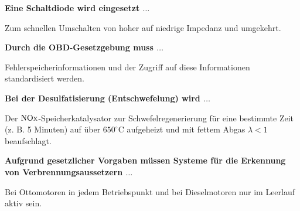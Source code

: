 \textbf{Eine Schaltdiode wird eingesetzt $\ldots$}

Zum schnellen Umschalten von hoher auf niedrige Impedanz und umgekehrt.

\textbf{Durch die OBD-Gesetzgebung muss $\ldots$}

Fehlerspeicherinformationen und der Zugriff auf diese Informationen
standardisiert werden.

\textbf{Bei der Desulfatisierung (Entschwefelung) wird $\ldots$}

Der $\ce{NOx}$-Speicherkatalysator zur Schwefelregenerierung für eine
bestimmte Zeit (z. B. 5 Minuten) auf über $650^\circ\text{C}$
aufgeheizt und mit fettem Abgas $\lambda < 1$ beaufschlagt.

\textbf{Aufgrund gesetzlicher Vorgaben müssen Systeme für die Erkennung
von Verbrennungsaussetzern $\ldots$}

Bei Ottomotoren in jedem Betriebspunkt und bei Dieselmotoren nur im
Leerlauf aktiv sein.
